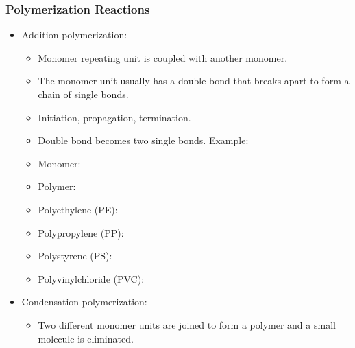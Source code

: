 \documentclass{article}
\begin{document}
\subsubsection{Polymerization Reactions}

\begin{itemize}
    \item Addition polymerization:
    \begin{itemize}
        \item Monomer repeating unit is coupled with another monomer.
        \item The monomer unit usually has a double bond that breaks apart to form a chain of single bonds.
        \item Initiation, propagation, termination.
        \item Double bond becomes two single bonds. Example:
        \item Monomer: 
        \item Polymer: 
        \item Polyethylene (PE): 
        \item Polypropylene (PP): 
        \item Polystyrene (PS): 
        \item Polyvinylchloride (PVC): 
    \end{itemize}
    \item Condensation polymerization:
    \begin{itemize}
        \item Two different monomer units are joined to form a polymer and a small molecule is eliminated.
    \end{itemize}
\end{itemize}
\end{document}
